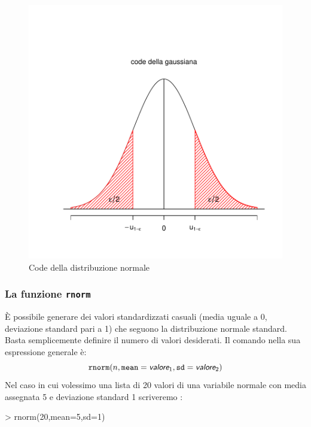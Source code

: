 \documentclass[onecolumn,12pt]{book}
\newcommand{\varia}[1]{\textsl{\textsf{#1}}}
\begin{document}
\begin{figure}[htbp]
\begin{center}
\includegraphics{RbookParte2-066}
\caption{ Code della distribuzione normale}
\label{normaletratto}
\end{center}
\end{figure}

 \subsubsection{La funzione \texttt{rnorm}}
\`E possibile generare dei valori standardizzati casuali (media uguale a 0, deviazione standard pari a 1) che seguono la distribuzione normale standard. Basta semplicemente definire il numero di valori desiderati.
Il comando nella sua espressione generale \`e:
\begin{equation}\texttt{rnorm}(n,\texttt{mean}=\varia{valore}_1,\texttt{sd}=\varia{valore}_2)\end{equation}
Nel caso in cui volessimo una lista di 20 valori di una variabile normale con media assegnata 5 e deviazione standard 1 scriveremo :

\begin{Schunk}
\begin{Sinput}
> rnorm(20,mean=5,sd=1)
\end{Sinput}
\end{Schunk}
\end{document}
